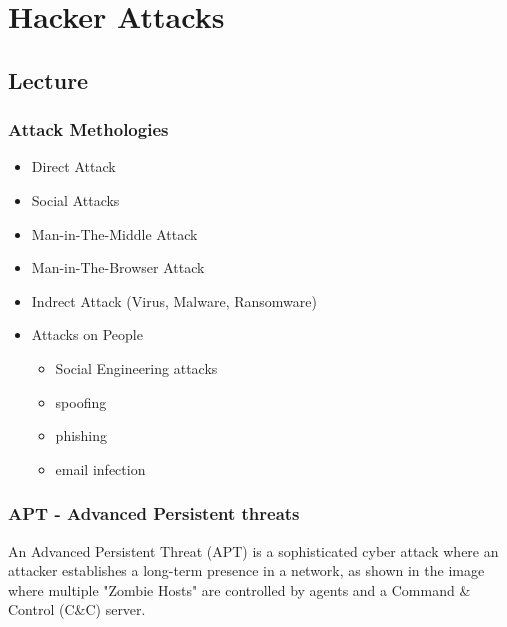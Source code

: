 \chapter{Hacker Attacks}
\newpage

\section{Lecture}

\subsection{Attack Methologies}
\begin{itemize}
    \item Direct Attack
    \item Social Attacks
    \item Man-in-The-Middle Attack
    \item Man-in-The-Browser Attack
    \item Indrect Attack (Virus, Malware, Ransomware)
    \item Attacks on People
    \begin{itemize}
        \item Social Engineering attacks
        \item spoofing
        \item phishing
        \item email infection
    \end{itemize}
\end{itemize}

\subsection{APT - Advanced Persistent threats}
An Advanced Persistent Threat (APT) is a sophisticated cyber attack where an attacker establishes a long-term presence in a network, as shown in the image where multiple "Zombie Hosts" are controlled by agents and a Command \& Control (C\&C) server.

